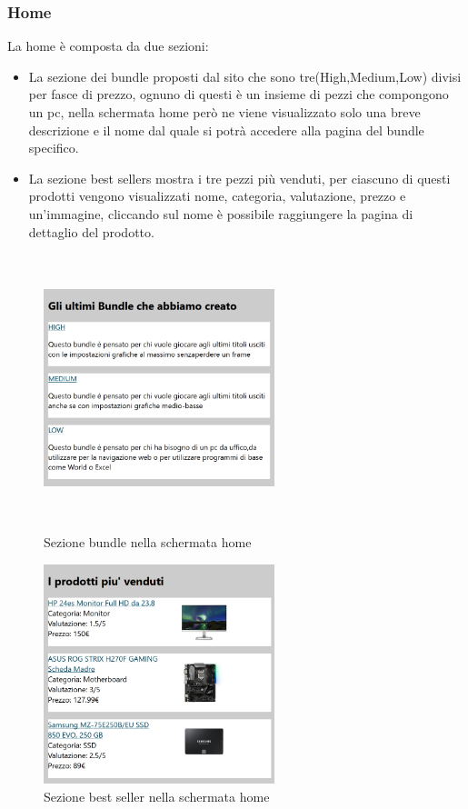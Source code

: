 \subsubsection{Home}
La home è composta da due sezioni:
\begin{itemize}
	\item La sezione dei bundle proposti dal sito che sono tre(High,Medium,Low) divisi per fasce di prezzo, ognuno di questi è un insieme di pezzi che compongono un pc, nella schermata home però ne viene visualizzato solo una breve descrizione e il nome dal quale si potrà accedere alla pagina del bundle specifico.
	\item La sezione best sellers mostra i tre pezzi più venduti, per ciascuno di questi prodotti vengono visualizzati nome, categoria, valutazione, prezzo e un'immagine, cliccando sul nome è possibile raggiungere la pagina di dettaglio del prodotto. \mbox{} \\ \mbox{} \\ \mbox{} \\
\end{itemize}
\begin{figure}[h!]
	\label{bundle} 
	\centering 
	\includegraphics[width=0.6\textwidth]{immagini/Bundle.png}
	\caption{Sezione bundle nella schermata home} 
	\mbox{} \\
\end{figure}
\begin{figure}[h!]
	\label{bs} 
	\centering 
	\includegraphics[width=0.6\textwidth]{immagini/bs.png}
	\caption{Sezione best seller nella schermata home} 
\end{figure}
\mbox{} \\

